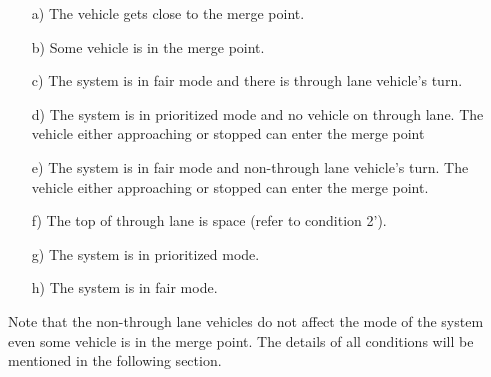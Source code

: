 \documentclass[10pt, conference, compsocconf]{IEEEtran}
\begin{document}
\begin{itemize}
  \item[a)] The vehicle gets close to the merge point. 
  \item[b)] Some vehicle is in the merge point. 
  \item[c)] The system is in fair mode and there is through lane vehicle's turn. 
  \item[d)] The system is in prioritized mode and no vehicle on through lane. The vehicle either 
  approaching or stopped can enter the merge point
  \item[e)] The system is in fair mode and non-through lane vehicle's turn. The vehicle either 
  approaching or stopped can enter the merge point. 
  \item[f)] The top of through lane is space (refer to condition 2'). 
  \item[g)] The system is in prioritized mode.
  \item[h)] The system is in fair mode. 
\end{itemize}

Note that the non-through lane vehicles do not affect the mode of the system even
some vehicle is in the merge point.
The details of all conditions will be mentioned in the following section.

 
\end{document}
